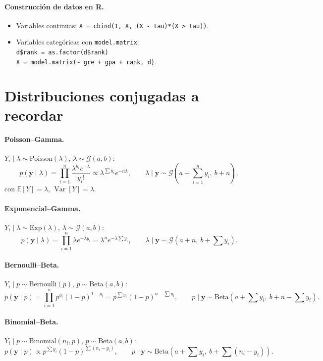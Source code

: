 \documentclass[11pt]{article}
\newcommand{\Ga}{\mathcal{G}}
\newcommand{\E}{\mathbb{E}}
\newcommand{\Var}{\operatorname{Var}}
\newcommand{\by}{\mathbf{y}}
\theoremstyle{definition}
\begin{document}
\paragraph{Construcción de datos en R.}
\begin{itemize}[leftmargin=2em]
  \item Variables continuas: \verb|X = cbind(1, X, (X - tau)*(X > tau))|.
  \item Variables categóricas con \verb|model.matrix|:\\
  \verb|d$rank = as.factor(d$rank)|\\
  \verb|X = model.matrix(~ gre + gpa + rank, d)|.
\end{itemize}

\section{Distribuciones conjugadas a recordar}
\paragraph{Poisson--Gamma.} $Y_i\mid\lambda\sim\text{Poisson}(\lambda)$, $\lambda\sim\Ga(a,b)$:
\[
p(\by\mid\lambda)=\prod_{i=1}^n\frac{\lambda^{y_i}e^{-\lambda}}{y_i!}\propto\lambda^{\sum y_i}e^{-n\lambda},
\qquad \lambda\mid\by\sim\Ga\!\left(a+\sum_{i=1}^n y_i,\ b+n\right),
\]
con $\E[Y]=\lambda$, $\Var[Y]=\lambda$.

\paragraph{Exponencial--Gamma.} $Y_i\mid\lambda\sim\text{Exp}(\lambda)$, $\lambda\sim\Ga(a,b)$:
\[
p(\by\mid\lambda)=\prod_{i=1}^n\lambda e^{-\lambda y_i}=\lambda^n e^{-\lambda\sum y_i},
\qquad \lambda\mid\by\sim\Ga\!\left(a+n,\ b+\sum y_i\right).
\]

\paragraph{Bernoulli--Beta.} $Y_i\mid p\sim\text{Bernoulli}(p)$, $p\sim\text{Beta}(a,b)$:
\[
p(\by\mid p)=\prod_{i=1}^n p^{y_i}(1-p)^{1-y_i}=p^{\sum y_i}(1-p)^{n-\sum y_i},
\qquad p\mid\by\sim\text{Beta}\!\left(a+\sum y_i,\ b+n-\sum y_i\right).
\]

\paragraph{Binomial--Beta.} $Y_i\mid p\sim\text{Binomial}(n_i,p)$, $p\sim\text{Beta}(a,b)$:
\[
p(\by\mid p)\propto p^{\sum y_i}(1-p)^{\sum(n_i-y_i)},
\qquad p\mid\by\sim\text{Beta}\!\left(a+\sum y_i,\ b+\sum(n_i-y_i)\right).
\]
\end{document}
